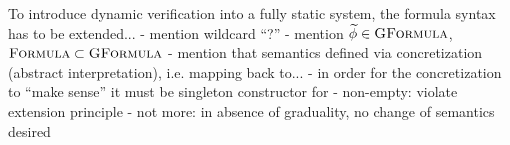 

To introduce dynamic verification into a fully static system, the formula syntax has to be extended... %
- mention wildcard “?”
- mention $\widetilde{\phi} \in \textsc{GFormula}$, $\textsc{Formula} \subset \textsc{GFormula}$
- mention that semantics defined via concretization (abstract interpretation), i.e. mapping back to...
    - in order for the concretization to “make sense” it must be singleton constructor for \setFormula
        - non-empty: violate extension principle
        - not more: in absence of graduality, no change of semantics desired